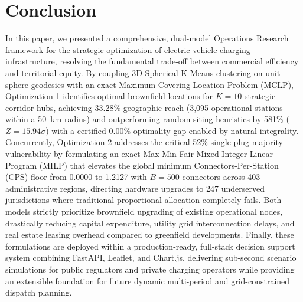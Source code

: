 \documentclass[conference]{IEEEtran}
\begin{document}
\section{Conclusion}
In this paper, we presented a comprehensive, dual-model Operations Research framework for the strategic optimization of electric vehicle charging infrastructure, resolving the fundamental trade-off between commercial efficiency and territorial equity. By coupling 3D Spherical K-Means clustering on unit-sphere geodesics with an exact Maximum Covering Location Problem (MCLP), Optimization 1 identifies optimal brownfield locations for $K = 10$ strategic corridor hubs, achieving 33.28\% geographic reach (3,095 operational stations within a 50~km radius) and outperforming random siting heuristics by 581\% ($Z = 15.94\sigma$) with a certified 0.00\% optimality gap enabled by natural integrality. Concurrently, Optimization 2 addresses the critical 52\% single-plug majority vulnerability by formulating an exact Max-Min Fair Mixed-Integer Linear Program (MILP) that elevates the global minimum Connectors-Per-Station (CPS) floor from 0.0000 to 1.2127 with $B = 500$ connectors across 403 administrative regions, directing hardware upgrades to 247 underserved jurisdictions where traditional proportional allocation completely fails. Both models strictly prioritize brownfield upgrading of existing operational nodes, drastically reducing capital expenditure, utility grid interconnection delays, and real estate leasing overhead compared to greenfield developments. Finally, these formulations are deployed within a production-ready, full-stack decision support system combining FastAPI, Leaflet, and Chart.js, delivering sub-second scenario simulations for public regulators and private charging operators while providing an extensible foundation for future dynamic multi-period and grid-constrained dispatch planning.
\end{document}
